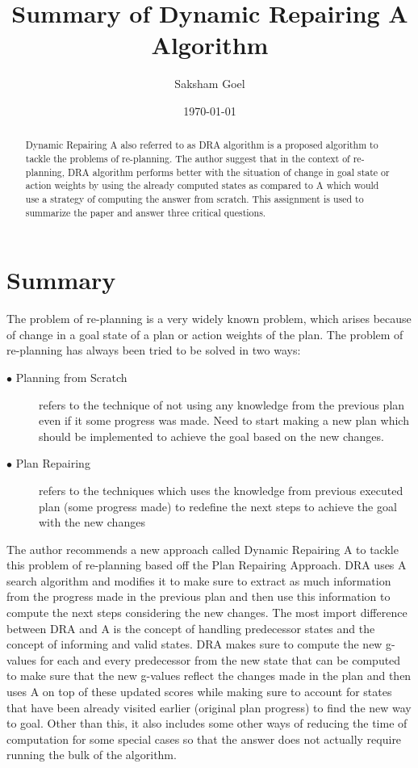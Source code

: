 \documentclass[a4paper]{article}
\title{Summary of Dynamic Repairing A\text{*} Algorithm}
\author{Saksham Goel}
\date{\today}
\begin{document}
\maketitle

\begin{abstract}
Dynamic Repairing A\text{*} also referred to as DRA\text{*} algorithm is a proposed algorithm to tackle the problems of re-planning. The author suggest that in the context of re-planning, DRA\text{*} algorithm performs better with the situation of change in goal state or action weights by using the already computed states as compared to A\text{*} which would use a strategy of computing the answer from scratch. This assignment is used to summarize the paper and answer three critical questions.
\end{abstract}

\section{Summary}
\label{sec:summary}
The problem of re-planning is a very widely known problem, which arises because of change in a goal state of a plan or action weights of the plan. The problem of re-planning has always been tried to be solved in two ways:

\begin{description}
  \item[$\bullet$ Planning from Scratch] refers to the technique of not using any knowledge from the previous plan even if it some progress was made. Need to start making a new plan which should be implemented to achieve the goal based on the new changes.
  \item[$\bullet$ Plan Repairing] refers to the techniques which uses the knowledge from previous executed plan (some progress made) to redefine the next steps to achieve the goal with the new changes
\end{description}

The author recommends a new approach called Dynamic Repairing A\text{*} to tackle this problem of re-planning based off the Plan Repairing Approach. DRA\text{*} uses A\text{*} search algorithm and modifies it to make sure to extract as much information from the progress made in the previous plan and then use this information to compute the next steps considering the new changes. The most import difference between DRA\text{*} and A\text{*} is the concept of handling predecessor states and the concept of informing and valid states. DRA\text{*} makes sure to compute the new g-values for each and every predecessor from the new state that can be computed to make sure that the new g-values reflect the changes made in the plan and then uses A\text{*} on top of these updated scores while making sure to account for states that have been already visited earlier (original plan progress) to find the new way to goal. Other than this, it also includes some other ways of reducing the time of computation for some special cases so that the answer does not actually require running the bulk of the algorithm.
\end{document}
